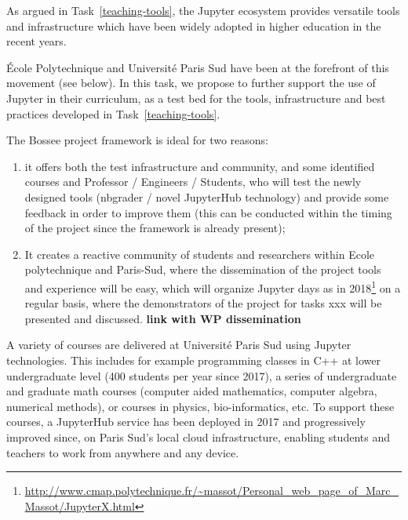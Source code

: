 \begin{task}[
  title=Teaching with Jupyter technology,
  id=teaching,
  lead=EP,
  PM=4, %
  wphases={0-48},
  partners={UPSUD}
  ]

  As argued in Task~\ref{teaching-tools}, the Jupyter ecosystem
  provides versatile tools and infrastructure which have been widely
  adopted in higher education in the recent years.

  École Polytechnique
  and Université Paris Sud have been at the forefront of this movement
  (see below). In this task, we propose to further support the use of
  Jupyter in their curriculum, as a test bed for the tools,
  infrastructure and best practices developed in
  Task~\ref{teaching-tools}.


  The Bossee project framework is ideal for two reasons:
  \begin{enumerate}
    \item it offers both the test infrastructure and community, and some identified courses and
  Professor / Engineers / Students, who will test the newly designed tools
  (nbgrader / novel JupyterHub technology) and provide some feedback in order to
  improve them (this can be conducted within the timing of the project since the
  framework is already present);
    \item It creates a reactive community of students
  and researchers within Ecole polytechnique and Paris-Sud, where the
  dissemination of the project tools and experience will be easy, which will
  organize Jupyter days as in 2018\footnote{\url{http://www.cmap.polytechnique.fr/~massot/Personal_web_page_of_Marc_Massot/JupyterX.html}} on a regular basis, where the demonstrators of the
  project for tasks xxx will be presented and discussed. {\bf link with WP
    dissemination}
  \end{enumerate}


  A variety of courses are delivered at Université Paris Sud using
  Jupyter technologies. This includes for example programming classes
  in C++ at lower undergraduate level (400 students per year since
  2017), a series of undergraduate and graduate math courses (computer
  aided mathematics, computer algebra, numerical methods), or courses
  in physics, bio-informatics, etc. To support these courses, a
  JupyterHub service has been deployed in 2017 and progressively
  improved since, on Paris Sud's local cloud infrastructure, enabling
  students and teachers to work from anywhere and any device.


\end{task}
